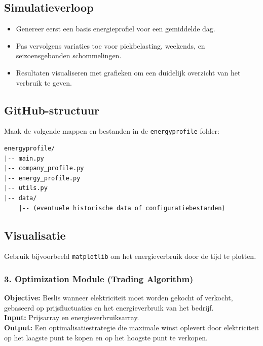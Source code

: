 \subsection{Simulatieverloop}
\begin{itemize}
    \item Genereer eerst een basis energieprofiel voor een gemiddelde dag.
    \item Pas vervolgens variaties toe voor piekbelasting, weekends, en seizoensgebonden schommelingen.
    \item Resultaten visualiseren met grafieken om een duidelijk overzicht van het verbruik te geven.
\end{itemize}

\subsection{GitHub-structuur}
Maak de volgende mappen en bestanden in de \texttt{energyprofile} folder:

\begin{verbatim}
energyprofile/
|-- main.py
|-- company_profile.py
|-- energy_profile.py
|-- utils.py
|-- data/
    |-- (eventuele historische data of configuratiebestanden)
\end{verbatim}

\subsection{Visualisatie}
Gebruik bijvoorbeeld \texttt{matplotlib} om het energieverbruik door de tijd te plotten.



\subsubsection{3. Optimization Module (Trading Algorithm)}
\textbf{Objective:} Beslis wanneer elektriciteit moet worden gekocht of verkocht, gebaseerd op prijsfluctuaties en het energieverbruik van het bedrijf. \\
\textbf{Input:} Prijsarray en energieverbruiksarray. \\
\textbf{Output:} Een optimalisatiestrategie die maximale winst oplevert door elektriciteit op het laagste punt te kopen en op het hoogste punt te verkopen.
